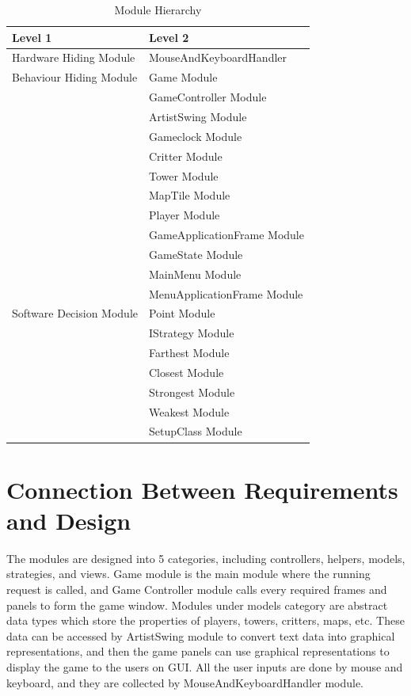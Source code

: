 \documentclass[12,english]{article}
\begin{document}
\begin{table}[!htbp]
        \begin{tabular}{ll}
        \toprule
        Level 1 & Level 2 \\
        \midrule
        Hardware Hiding Module & MouseAndKeyboardHandler \\
         \midrule
        Behaviour Hiding Module & Game Module \\
        & GameController Module\\
        & ArtistSwing Module\\
        & Gameclock Module\\ 
		& Critter Module \\
		& Tower Module \\
		& MapTile Module \\
		& Player Module \\
		& GameApplicationFrame Module \\
		& GameState Module \\
		& MainMenu Module \\
		& MenuApplicationFrame Module \\
		
		
		 \midrule
        Software Decision Module & Point Module\\
        & IStrategy Module\\
        & Farthest Module \\
		& Closest Module \\
		& Strongest Module \\
		& Weakest Module \\
		& SetupClass Module \\
		
        \bottomrule
        \end{tabular}
        \caption{Module Hierarchy}
        \makeatletter
           \def\rulecolor#1#{\CT@arc{#1}}
           \def\CT@arc#1#2{%
           \ifdim\baselineskip=\z@\noalign\fi
           {\gdef\CT@arc@{\color#1{#2}}}}
           \let\CT@arc@\relax
        \makeatother
        \label{Table 1}
        \end{table}

\section{Connection Between Requirements and Design}

The modules are designed into 5 categories, including controllers, helpers, models, strategies, and views. Game module is the main module where the running request is called, and Game Controller module calls every required frames and panels to form the game window. Modules under models category are abstract data types which store the properties of players, towers, critters, maps, etc. These data can be accessed by ArtistSwing module to convert text data into graphical representations, and then the game panels can use graphical representations to display the game to the users on GUI. All the user inputs are done by mouse and keyboard, and they are collected by MouseAndKeyboardHandler module. 
\end{document}

